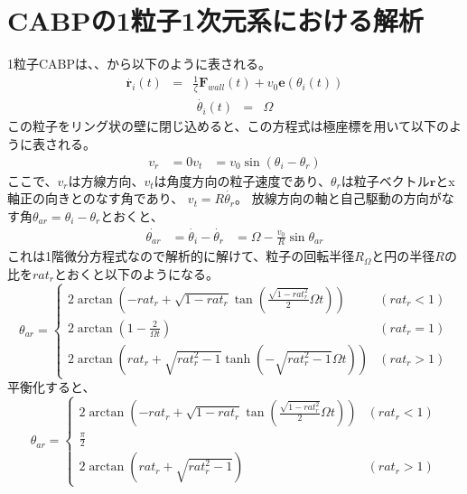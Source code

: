 \documentclass[../thesis]{subfiles}
\begin{document}
\section{CABPの1粒子1次元系における解析}
1粒子CABPは、、から以下のように表される。
\begin{eqnarray}\label{eq:eom_CABP_1}
    \dot{\bm{r}_i}(t) &=& \frac{1}{\zeta} \bm{F}_{wall}(t)+v_0 \bm{e}(\theta_i (t))
\end{eqnarray}
\begin{eqnarray}\label{eq:eom_CABP_2}
    \dot{\theta_i }(t) &=& \Omega
\end{eqnarray}
この粒子をリング状の壁に閉じ込めると、この方程式は極座標を用いて以下のように表される。
\begin{align}
    v_r&=0
    v_t&=v_0 \sin(\theta_i-\theta_r)
\end{align}
ここで、$v_r$は方線方向、$v_t$は角度方向の粒子速度であり、$\theta_r$は粒子ベクトル$\bm{r}$とx軸正の向きとのなす角であり、
$v_t=R\dot{\theta_r}$。
放線方向の軸と自己駆動の方向がなす角$\theta_{ar}=\theta_i-\theta_r$とおくと、
\begin{align}
    \dot{\theta_{ar}}&=\dot{\theta_i}-\dot{\theta_r}
    &=\Omega-\frac{v_0}{R}\sin \theta_{ar}
\end{align}
これは1階微分方程式なので解析的に解けて、粒子の回転半径$R_\Omega$と円の半径$R$の比を$rat_r$とおくと以下のようになる。
\begin{equation}
    \theta_{ar}=
    \begin{cases}
        2 \arctan(-rat_r+\sqrt{1-rat_r}\tan (\frac{\sqrt{1-rat_r^2}}{2}\Omega t))&(rat_r<1)\\
        2 \arctan(1-\frac{2}{\Omega t}) &(rat_r=1)\\
        2 \arctan(rat_r+\sqrt{rat_r^2-1}\tanh(-\sqrt{rat_r^2-1}\Omega t))& (rat_r>1)
    \end{cases}
\end{equation}
平衡化すると、
\begin{equation}
    \theta_{ar}=
    \begin{cases}
        2 \arctan(-rat_r+\sqrt{1-rat_r}\tan (\frac{\sqrt{1-rat_r^2}}{2}\Omega t))&(rat_r<1)\\
        \frac{\pi}{2}\\
        2 \arctan(rat_r+\sqrt{rat_r^2-1})& (rat_r>1)
    \end{cases}
\end{equation}
\end{document}
